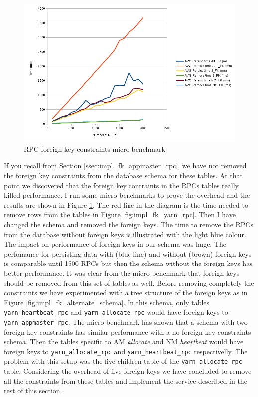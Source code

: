\begin{figure}
\centering
\includegraphics[scale=0.7]{resources/images/Implementation/rpc_fk_overhead.png}
\caption{RPC foreign key constraints micro-benchmark}
\label{fig:impl_fk_overhead}
\end{figure}

If you recall from Section \ref{ssec:impl_fk_appmaster_rpc}, we have
not removed the foreign key constraints from the database schema for
these tables. At that point we discovered that the foreign
key contraints in the RPCs tables really killed performance. I run
some micro-benchmarks to prove the overhead and the results are shown in
Figure \ref{fig:impl_fk_overhead}. The red line in the diagram is the
time needed to remove rows from the tables in Figure
\ref{fig:impl_fk_yarn_rpc}. Then I have changed the schema and removed
the foreign keys. The time to remove the RPCs from the database
without foreign keys is illustrated with the light blue colour. The impact
on performance of foreign keys in our schema was huge. The perfomance
for persisting data with (blue line) and without (brown) foreign keys
is comparable until 1500 RPCs but then the schema without the foreign
keys has better performance. It was clear from the micro-benchmark that
foreign keys should be removed from this set of tables as well. Before
removing completely the constraints we have experimented with a tree
structure of the foreign keys as in Figure
\ref{fig:impl_fk_alternate_schema}. In this schema, only tables
\texttt{yarn\_heartbeat\_rpc} and \texttt{yarn\_allocate\_rpc} would
have foreign keys to \texttt{yarn\_appmaster\_rpc}. The
micro-benchmark has shown that a schema with two foreign key
constraints has similar performance with a no foreign key constraints
schema. Then the tables specific to AM \emph{allocate} and NM
\emph{heartbeat} would have foreign keys to
\texttt{yarn\_allocate\_rpc} and \texttt{yarn\_heartbeat\_rpc}
respectivelly. The problem with this setup was the five children table
of the \texttt{yarn\_allocate\_rpc} table. Considering the overhead of
five foreign keys we have concluded
to remove all the constraints from these tables and implement the
service described in the rest of this section.

